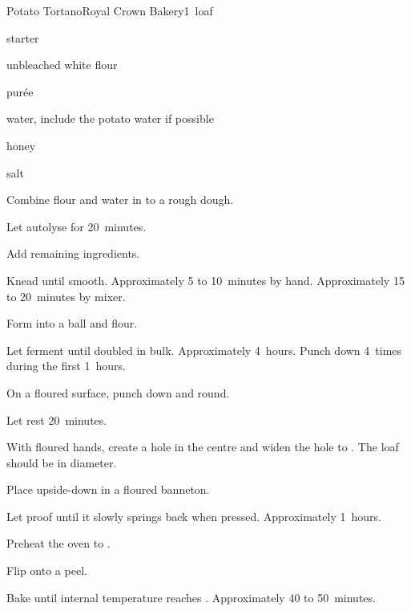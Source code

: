 \begin{recipe}{Potato Tortano}{Royal Crown Bakery}{1~loaf}

\begin{ingredients}
\item {} starter
\item {} unbleached white flour
\item {}  purée
\item {} water, include the potato water if possible
\item {} honey
\item {} salt
\end{ingredients}

\begin{directions}
\item Combine flour and water in to a rough dough.
\item Let autolyse for 20~minutes.
\item Add remaining ingredients.
\item Knead until smooth. Approximately 5 to 10~minutes by hand. Approximately 15 to 20~minutes by mixer.
\item Form into a ball and flour.
\item Let ferment until doubled in bulk. Approximately 4~hours. Punch down 4~times during the first 1\half{}~hours.
\item On a floured surface, punch down and round.
\item Let rest 20~minutes.
\item With floured hands, create a hole in the centre and widen the hole to . The loaf should be  in diameter.
\item Place upside-down in a floured banneton.
\item Let proof until it slowly springs back when pressed. Approximately 1\half{}~hours.
\item Preheat the oven to .
\item Flip onto a peel.
\item Bake until internal temperature reaches . Approximately 40 to 50~minutes.
\end{directions}

\end{recipe}
